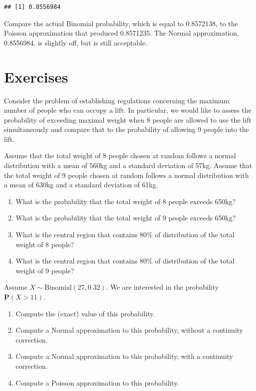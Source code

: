 \documentclass[
]{krantz}
\newcommand{\Prob}{\mathbf{P}}
\theoremstyle{definition}
\theoremstyle{definition}
\theoremstyle{definition}
\theoremstyle{remark}
\let\BeginKnitrBlock\begin \let\EndKnitrBlock\end
\begin{document}
\begin{verbatim}
## [1] 0.8556984
\end{verbatim}

Compare the actual Binomial probability, which is equal to 0.8572138, to
the Poisson approximation that produced 0.8571235. The Normal
approximation, 0.8556984, is slightly off, but is still acceptable.

\hypertarget{Normal4}{%
\section{Exercises}\label{Normal4}}

\BeginKnitrBlock{exercise}
\protect\hypertarget{exr:unnamed-chunk-92}{}{\label{exr:unnamed-chunk-92} }Consider the problem of establishing regulations
concerning the maximum number of people who can occupy a lift. In
particular, we would like to assess the probability of exceeding maximal
weight when 8 people are allowed to use the lift simultaneously and
compare that to the probability of allowing 9 people into the lift.

Assume that the total weight of 8 people chosen at random follows a
normal distribution with a mean of 560kg and a standard deviation of
57kg. Assume that the total weight of 9 people chosen at random follows
a normal distribution with a mean of 630kg and a standard deviation of
61kg.

\begin{enumerate}
\def\labelenumi{\arabic{enumi}.}
\item
  What is the probability that the total weight of 8 people exceeds
  650kg?
\item
  What is the probability that the total weight of 9 people exceeds
  650kg?
\item
  What is the central region that contains 80\% of distribution of the
  total weight of 8 people?
\item
  What is the central region that contains 80\% of distribution of the
  total weight of 9 people?
\end{enumerate}
\EndKnitrBlock{exercise}

\BeginKnitrBlock{exercise}
\protect\hypertarget{exr:unnamed-chunk-93}{}{\label{exr:unnamed-chunk-93} }Assume \(X \sim \mbox{Binomial}(27,0.32)\). We are
interested in the probability \(\Prob(X > 11)\).

\begin{enumerate}
\def\labelenumi{\arabic{enumi}.}
\item
  Compute the (exact) value of this probability.
\item
  Compute a Normal approximation to this probability, without a
  continuity correction.
\item
  Compute a Normal approximation to this probability, with a
  continuity correction.
\item
  Compute a Poisson approximation to this probability.
\end{enumerate}
\EndKnitrBlock{exercise}
\end{document}
